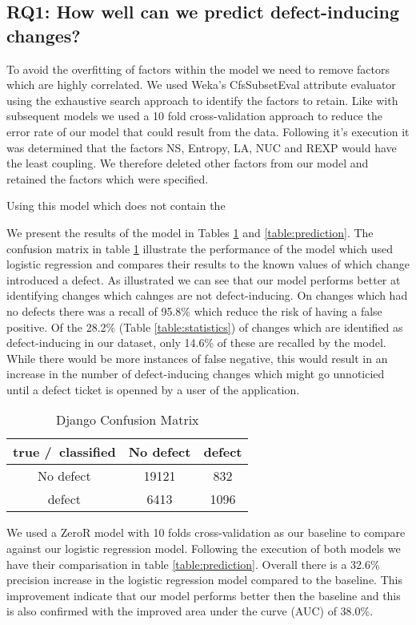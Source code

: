 \documentclass[10pt, conference]{IEEEtran}
\begin{document}
\subsection{RQ1: How well can we predict defect-inducing changes?}
\label{sec:rq1}


To avoid the overfitting of factors within the model we need to remove factors which are highly correlated. We used Weka's CfsSubsetEval attribute evaluator using the exhaustive search approach to identify the factors to retain. Like with subsequent models we used a 10 fold cross-validation approach to reduce the error rate of our model that could result from the data. Following it's execution it was determined that the factors NS, Entropy, LA, NUC and REXP would have the least coupling. We therefore deleted other factors from our model and retained the factors which were specified.



Using this model which does not contain the 

We present the results of the model in Tables \ref{table:confusion} and \ref{table:prediction}. The confusion matrix in table \ref{table:confusion} illustrate the performance of the model which used logistic regression and compares their results to the known values of which change introduced a defect. As illustrated we can see that our model performs better at identifying changes which cahnges are not defect-inducing. On changes which had no defects there was a recall of 95.8\% which reduce the risk of having a false positive. Of the 28.2\% (Table \ref{table:statistics}) of changes which are identified as defect-inducing in our dataset, only 14.6\% of these are recalled by the model. While there would be more instances of false negative, this would result in an increase in the number of defect-inducing changes which might go unnoticied until a defect ticket is openned by a user of the application.  
\begin{table}[b]
	\centering
	\caption{Django Confusion Matrix}
	\begin{tabular}{|c|c|c|}
		\hline 
		true /\ classified  & No defect  & defect \tabularnewline
		\hline 
		No defect  & 19121  & 832 \tabularnewline
		\hline 
		defect  & 6413  & 1096 \tabularnewline
		\hline 
	\end{tabular}
	\label{table:confusion}
\end{table}

We used a ZeroR model with 10 folds cross-validation as our baseline to compare against our logistic regression model. Following the execution of both models we have their comparisation in table \ref{table:prediction}. Overall there is a 32.6\% precision increase in the logistic regression model compared to the baseline. This improvement indicate that our model performs better then the baseline and this is also confirmed with the improved area under the curve (AUC) of 38.0\%.   
\end{document}
